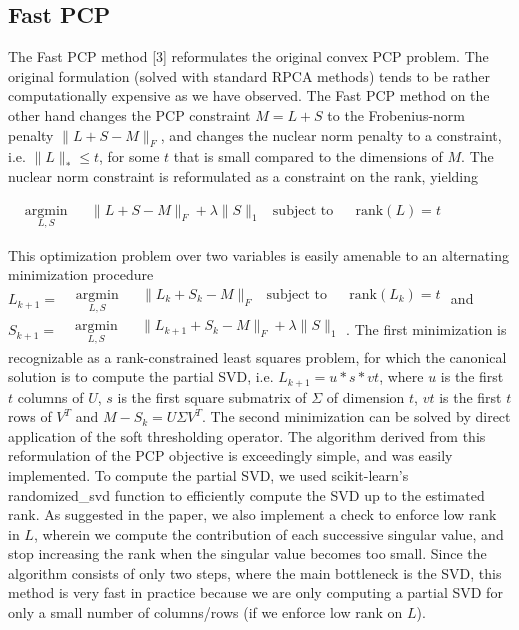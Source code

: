 \documentclass[oneside]{article}
\begin{document}
\subsection{Fast PCP}
The Fast PCP method [3] reformulates the original convex PCP problem. The original formulation (solved with standard RPCA methods) tends to be rather computationally expensive as we have observed. The Fast PCP method on the other hand changes the PCP constraint $M = L+S$ to the Frobenius-norm penalty $\lVert L+S-M\rVert_{F}$, and changes the nuclear norm penalty to a constraint, i.e. $\lVert L\rVert_{*} \le t$, for some $t$ that is small compared to the dimensions of $M$. The nuclear norm constraint is reformulated as a constraint on the rank, yielding
\begin{center}
$
\begin{aligned}
& \underset{L,S}{\text{argmin}}
& & \lVert L+S-M\rVert_{F}+ \lambda\lVert S\rVert_{1} 
& \text{subject to}
& & \text{rank}(L) = t
\end{aligned}
$
\end{center}
This optimization problem over two variables is easily amenable to an alternating minimization procedure $
L_{k+1}  =\begin{aligned}
& \underset{L,S}{\text{argmin}}
& & \lVert L_{k}+S_{k}-M\rVert_{F}
& \text{subject to}
& & \text{rank}(L_{k}) = t
\end{aligned}
$ and $S_{k+1} = \begin{aligned}
& \underset{L,S}{\text{argmin}}
& & \lVert L_{k+1}+S_{k}-M\rVert_{F}+ \lambda\lVert S\rVert_{1} 
\end{aligned}
$. The first minimization is recognizable as a rank-constrained least squares problem, for which the canonical solution is to compute the partial SVD, i.e. $L_{k+1} = u*s*vt$, where $u$ is the first $t$ columns of $U$, $s$ is the first square submatrix of $\Sigma$ of dimension $t$, $vt$ is the first $t$ rows of $V^{T}$ and  $M-S_{k} = U\Sigma V^{T}$. The second minimization can be solved by direct application of the soft thresholding operator.\newline\newline
The algorithm derived from this reformulation of the PCP objective is exceedingly simple, and was easily implemented. To compute the partial SVD, we used scikit-learn's randomized\_svd function to efficiently compute the SVD up to the estimated rank. As suggested in the paper, we also implement a check to enforce low rank in $L$, wherein we compute the contribution of each successive singular value, and stop increasing the rank when the singular value becomes too small. Since the algorithm consists of only two steps, where the main bottleneck is the SVD, this method is very fast in practice because we are only computing a partial SVD for only a small number of columns/rows (if we enforce low rank on $L$).
\end{document}
